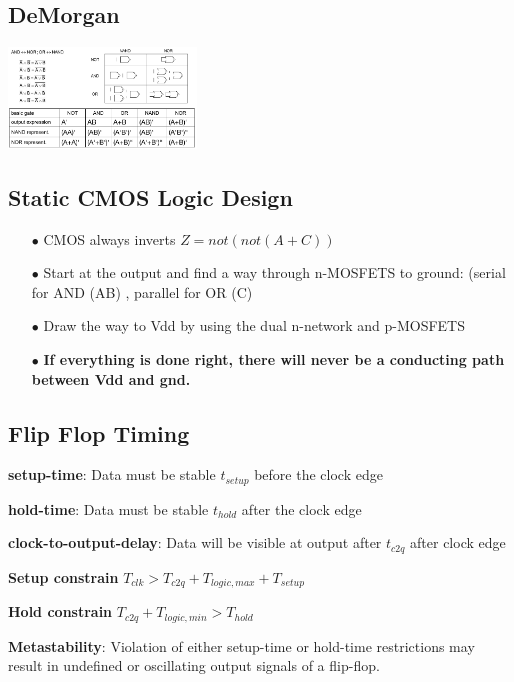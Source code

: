 \documentclass[english]{latex4ei/latex4ei_sheet}
\begin{document}
\subsection{DeMorgan}
\begin{center}
    \includegraphics[width = 5cm ]{images/2. SoC Logic Design Recap/DeMorgan.png}
\end{center}
\subsection{Static CMOS Logic Design}
\begin{enumerate}
    \item[$\bullet$] CMOS always inverts $Z = not(not(A + C))$
    \item[$\bullet$] Start at the output and find a way through n-MOSFETS to ground: (serial for AND (AB) , parallel for OR (C)
    \item[$\bullet$] Draw the way to Vdd by using the dual n-network and p-MOSFETS
    \item[$\bullet$] \textbf{If everything is done right, there will
never be a conducting path between Vdd
and gnd.}
\end{enumerate}



\subsection{Flip Flop Timing}

    \textbf{setup-time}: Data must be stable $t_{setup}$ before the clock edge
    
    \textbf{hold-time}: Data must be stable $t_{hold}$ after the clock edge

    \textbf{clock-to-output-delay}: Data will be visible at output after $t_{c2q}$ after clock edge

    \textbf{Setup constrain} $T_{clk} > T_{c2q} + T_{logic, max} + T_{setup}$
    
    \textbf{Hold constrain} $T_{c2q} + T_{logic, min} > T_{hold}$ 

    \textbf{Metastability}: Violation of either setup-time or hold-time restrictions may result in undefined or oscillating output signals of a flip-flop.
\end{document}
